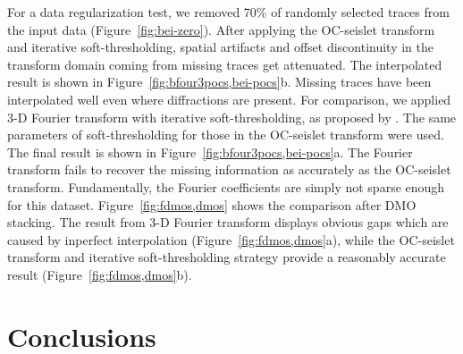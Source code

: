 For a data regularization test, we removed 70\% of randomly selected
traces from the input data (Figure~\ref{fig:bei-zero}). After applying
the OC-seislet transform and iterative soft-thresholding, spatial
artifacts and offset discontinuity in the transform domain coming from
missing traces get attenuated. The interpolated result is shown in
Figure~\ref{fig:bfour3pocs,bei-pocs}b. Missing traces have been
interpolated well even where diffractions are present. For comparison,
we applied 3-D Fourier transform with iterative soft-thresholding, as
proposed by \cite{Abma06}. The same parameters of soft-thresholding
for those in the OC-seislet transform were used.  The final result is
shown in Figure~\ref{fig:bfour3pocs,bei-pocs}a. The Fourier transform
fails to recover the missing information as accurately as the
OC-seislet transform. Fundamentally, the Fourier coefficients are
simply not sparse enough for this dataset. Figure~\ref{fig:fdmos,dmos}
shows the comparison after DMO stacking. The result from 3-D Fourier
transform displays obvious gaps which are caused by inperfect
interpolation (Figure~\ref{fig:fdmos,dmos}a), while the OC-seislet
transform and iterative soft-thresholding strategy provide a
reasonably accurate result (Figure~\ref{fig:fdmos,dmos}b).



		     
 \section{Conclusions}

